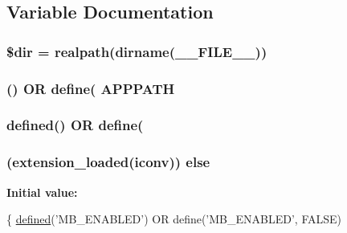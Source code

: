 \subsection{Variable Documentation}
\hypertarget{_bootstrap_8php_a1659f0a629d408e0f849dbe4ee061e62}{}
\subsubsection[{\$dir}]{\setlength{\rightskip}{0pt plus 5cm}\$dir = realpath(dirname(\+\_\+\+\_\+\+F\+I\+L\+E\+\_\+\+\_\+))}\label{_bootstrap_8php_a1659f0a629d408e0f849dbe4ee061e62}
\hypertarget{_bootstrap_8php_a45cc636071e9edf22e5709d3c18bc84f}{}
\subsubsection[{A\+P\+P\+P\+A\+T\+H}]{ (\textquotesingle{}) O\+R define(\textquotesingle{} A\+P\+P\+P\+A\+T\+H}\label{_bootstrap_8php_a45cc636071e9edf22e5709d3c18bc84f}
\hypertarget{_bootstrap_8php_a46458e8654a714e0565e20f63021add9}{}
\subsubsection[{defined}]{\setlength{\rightskip}{0pt plus 5cm}defined(\textquotesingle{}) O\+R define(\textquotesingle{}}\label{_bootstrap_8php_a46458e8654a714e0565e20f63021add9}
\hypertarget{_bootstrap_8php_a67773d041d277deb84668d80e4099034}{}
\subsubsection[{else}]{ (extension\+\_\+loaded(\textquotesingle{}iconv\textquotesingle{})) else}\label{_bootstrap_8php_a67773d041d277deb84668d80e4099034}
{\bfseries Initial value\+:}
\begin{DoxyCode}
\{
    \hyperlink{_bootstrap_8php_a46458e8654a714e0565e20f63021add9}{defined}(\textcolor{stringliteral}{'MB\_ENABLED'}) OR define('MB\_ENABLED', FALSE)
\end{DoxyCode}
\hypertarget{_bootstrap_8php_acbea7ca989439eea4c6019ad3c5161aa}{}
